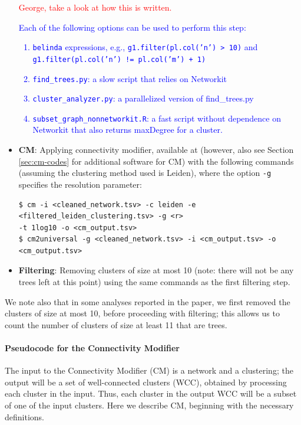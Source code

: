 \documentclass[a4paper]{article}   	%
\begin{document}
\begin{itemize}
\textcolor{red}{George, take a look at how this is written.}
\textcolor{blue}{
Each of the  following options can be used to perform this step: %
\begin{enumerate}
\item \texttt{belinda} \citep{belinda2022} expressions, e.g., \texttt{g1.filter(pl.col('n') > 10)} and \texttt{g1.filter(pl.col('n') != pl.col('m') + 1)}
\item \texttt{find\_trees.py}: a slow script that relies on Networkit \citep{Staudt2016}
\item \texttt{cluster\_analyzer.py}: a parallelized version of find\_trees.py
\item \texttt{subset\_graph\_nonnetworkit.R}: a fast script without dependence on Networkit that also returns maxDegree for a cluster.
\end{enumerate}
}
\item  \textbf{CM}: Applying connectivity modifier, available at \cite{cm2022} (however, also see Section \ref{sec:cm-codes} for additional software for CM)
 with the following commands (assuming the clustering method used is Leiden), where the option \texttt{-g} specifies the resolution parameter:
\begin{lstlisting}[basicstyle=\ttfamily\small]
$ cm -i <cleaned_network.tsv> -c leiden -e <filtered_leiden_clustering.tsv> -g <r>
-t 1log10 -o <cm_output.tsv>
$ cm2universal -g <cleaned_network.tsv> -i <cm_output.tsv> -o <cm_output.tsv>
\end{lstlisting}
\item \textbf{Filtering}: Removing clusters of size at most 10  (note: there will not be any trees left at this point) using the same commands as the first filtering step.
\end{itemize}

We note also that in some analyses reported in the paper, we first removed the clusters of size at most 10, before proceeding with filtering; this allows us
to count the number of clusters of size at least 11 that are trees.



\paragraph{Pseudocode for the Connectivity Modifier}
The input to the Connectivity Modifier (CM) is a network and a  clustering; the output will be a set of well-connected clusters (WCC), obtained
by processing each cluster in the input.
Thus, each cluster in the output WCC will be a subset of one of the input clusters.
Here we describe CM, beginning  with the necessary definitions.
\end{document}

